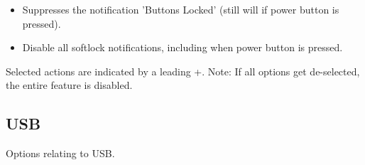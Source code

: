 {\begin{description}
\begin{itemize}
{                } %
                \item[Disable Locked Reminders]
                Suppresses the notification 'Buttons Locked'
                    (still will if power button is pressed).
                \item[Disable All Lock Notifications]
                Disable all softlock notifications, including when power button
                is pressed.

                \end{itemize}
        Selected actions are indicated by a leading +.
        Note: If all options get de-selected, the entire feature is disabled.

        \end{description}
} %


\subsection{USB}
    Options relating to USB.

